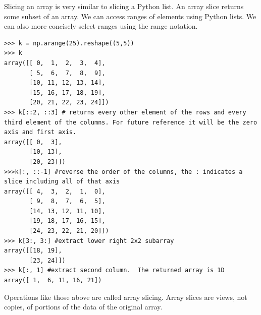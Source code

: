 Slicing an array is very similar to slicing a Python list. An array
slice returns some subset of an array. We can access ranges of elements
using Python lists. We can also more concisely select ranges using the
 range notation. 
\begin{lstlisting}
>>> k = np.arange(25).reshape((5,5)) 
>>> k
array([[ 0,  1,  2,  3,  4],
       [ 5,  6,  7,  8,  9],
       [10, 11, 12, 13, 14],
       [15, 16, 17, 18, 19],
       [20, 21, 22, 23, 24]])
>>> k[::2, ::3] # returns every other element of the rows and every third element of the columns. For future reference it will be the zero axis and first axis.
array([[ 0,  3],
       [10, 13],
       [20, 23]])
>>>k[:, ::-1] #reverse the order of the columns, the : indicates a slice including all of that axis
array([[ 4,  3,  2,  1,  0],
       [ 9,  8,  7,  6,  5],
       [14, 13, 12, 11, 10],
       [19, 18, 17, 16, 15],
       [24, 23, 22, 21, 20]])
>>> k[3:, 3:] #extract lower right 2x2 subarray
array([[18, 19],
       [23, 24]])
>>> k[:, 1] #extract second column.  The returned array is 1D
array([ 1,  6, 11, 16, 21]) 
\end{lstlisting} 

Operations like those above
are called array slicing. Array slices are views, not copies, of
portions of the data of the original array.

% 
